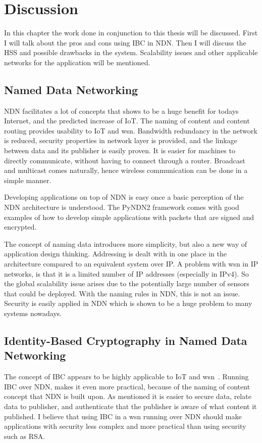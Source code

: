 \chapter{Discussion}
In this chapter the work done in conjunction to this thesis will be discussed. 
First I will talk about the pros and cons using \gls{IBC} in \gls{NDN}.
Then I will discuss the \gls{HSS} and possible drawbacks in the system. 
Scalability issues and other applicable networks for the application will be mentioned.

\section{Named Data Networking}
\gls{NDN} facilitates a lot of concepts that shows to be a huge benefit for todays Internet, and the predicted increase of \gls{IoT}.
The naming of content and content routing provides usability to \gls{IoT} and \gls{wsn}.
Bandwidth redundancy in the network is reduced, security properties in network layer is provided, and the linkage between data and its publisher is easily proven. 
It is easier for machines to directly communicate, without having to connect through a router.
Broadcast and multicast comes naturally, hence wireless communication can be done in a simple manner.

Developing applications on top of \gls{NDN} is easy once a basic perception of the \gls{NDN} architecture is understood.
The \gls{PyNDN2} framework comes with good examples of how to develop simple applications with packets that are signed and encrypted.

The concept of naming \gls{data} introduces more simplicity, but also a new way of application design thinking.
Addressing is dealt with in one place in the architecture compared to an equivalent system over \gls{IP}. 
A problem with \gls{wsn} in \gls{IP} networks, is that it is a limited number of \gls{IP} addresses (especially in \gls{IPv4}).
So the global scalability issue arises due to the potentially large number of sensors that could be deployed. 
With the naming rules in \gls{NDN}, this is not an issue.
Security is easily applied in \gls{NDN} which is shown to be a huge problem to many systems nowadays.


\section{Identity-Based Cryptography in Named Data Networking}
The concept of \gls{IBC} appears to be highly applicable to \gls{IoT} and \gls{wsn}~\cite{Patil:2012:SWS:2464778}.
Running \gls{IBC} over \gls{NDN}, makes it even more practical, because of the naming of content concept that \gls{NDN} is built upon. 
As mentioned it is easier to secure data, relate data to publisher, and authenticate that the publisher is aware of what content it published. 
I believe that using \gls{IBC} in a \gls{wsn} running over \gls{NDN} should make applications with security less complex and more practical than using security such as RSA. 


